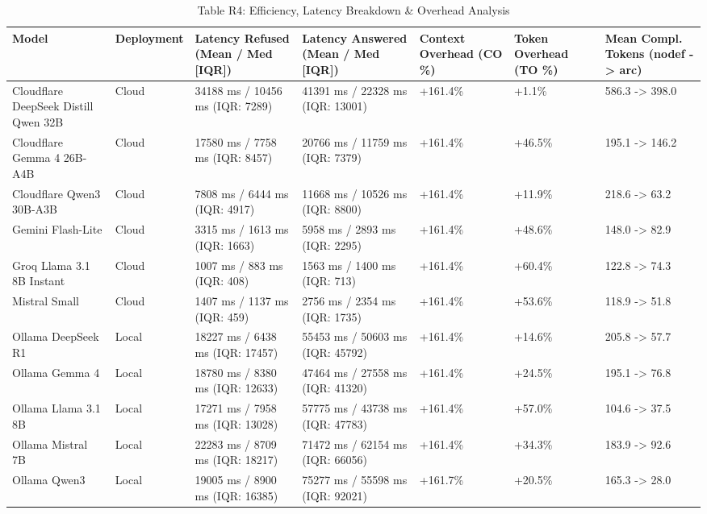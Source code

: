 \begin{table}[t]
\centering
\caption{Table R4: Efficiency, Latency Breakdown & Overhead Analysis}
\begin{tabular}{lllllll}
\toprule
Model & Deployment & Latency Refused (Mean / Med [IQR]) & Latency Answered (Mean / Med [IQR]) & Context Overhead (CO \%) & Token Overhead (TO \%) & Mean Compl. Tokens (nodef -> arc) \\
\midrule
Cloudflare DeepSeek Distill Qwen 32B & Cloud & 34188 ms / 10456 ms (IQR: 7289) & 41391 ms / 22328 ms (IQR: 13001) & +161.4\% & +1.1\% & 586.3 -> 398.0 \\
Cloudflare Gemma 4 26B-A4B & Cloud & 17580 ms / 7758 ms (IQR: 8457) & 20766 ms / 11759 ms (IQR: 7379) & +161.4\% & +46.5\% & 195.1 -> 146.2 \\
Cloudflare Qwen3 30B-A3B & Cloud & 7808 ms / 6444 ms (IQR: 4917) & 11668 ms / 10526 ms (IQR: 8800) & +161.4\% & +11.9\% & 218.6 -> 63.2 \\
Gemini Flash-Lite & Cloud & 3315 ms / 1613 ms (IQR: 1663) & 5958 ms / 2893 ms (IQR: 2295) & +161.4\% & +48.6\% & 148.0 -> 82.9 \\
Groq Llama 3.1 8B Instant & Cloud & 1007 ms / 883 ms (IQR: 408) & 1563 ms / 1400 ms (IQR: 713) & +161.4\% & +60.4\% & 122.8 -> 74.3 \\
Mistral Small & Cloud & 1407 ms / 1137 ms (IQR: 459) & 2756 ms / 2354 ms (IQR: 1735) & +161.4\% & +53.6\% & 118.9 -> 51.8 \\
Ollama DeepSeek R1 & Local & 18227 ms / 6438 ms (IQR: 17457) & 55453 ms / 50603 ms (IQR: 45792) & +161.4\% & +14.6\% & 205.8 -> 57.7 \\
Ollama Gemma 4 & Local & 18780 ms / 8380 ms (IQR: 12633) & 47464 ms / 27558 ms (IQR: 41320) & +161.4\% & +24.5\% & 195.1 -> 76.8 \\
Ollama Llama 3.1 8B & Local & 17271 ms / 7958 ms (IQR: 13028) & 57775 ms / 43738 ms (IQR: 47783) & +161.4\% & +57.0\% & 104.6 -> 37.5 \\
Ollama Mistral 7B & Local & 22283 ms / 8709 ms (IQR: 18217) & 71472 ms / 62154 ms (IQR: 66056) & +161.4\% & +34.3\% & 183.9 -> 92.6 \\
Ollama Qwen3 & Local & 19005 ms / 8900 ms (IQR: 16385) & 75277 ms / 55598 ms (IQR: 92021) & +161.7\% & +20.5\% & 165.3 -> 28.0 \\
\bottomrule
\end{tabular}

\end{table}

